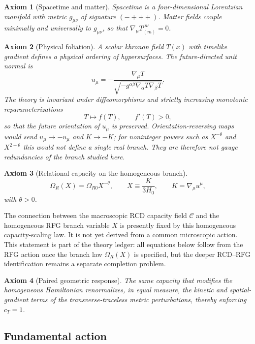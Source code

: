 \documentclass[11pt,a4paper]{article}
\newtheorem{axiom}{Axiom}[section]
\newcommand{\C}{\mathcal{C}}
\begin{document}
\begin{axiom}[Spacetime and matter]
Spacetime is a four-dimensional Lorentzian manifold with metric \(g_{\mu\nu}\) of signature \((-+++)\). Matter fields couple minimally and universally to \(g_{\mu\nu}\), so that \(\nabla_\mu T^{\mu\nu}_{(m)}=0\).
\end{axiom}

\begin{axiom}[Physical foliation]
A scalar khronon field \(T(x)\) with timelike gradient defines a physical ordering of hypersurfaces. The future-directed unit normal is
\[
u_\mu=-\frac{\nabla_\mu T}{\sqrt{-g^{\alpha\beta}\nabla_\alpha T\nabla_\beta T}}.
\]
The theory is invariant under diffeomorphisms and strictly increasing monotonic reparameterizations
\[
T\mapsto f(T),\qquad f'(T)>0,
\]
so that the future orientation of \(u_\mu\) is preserved. Orientation-reversing maps would send \(u_\mu\to-u_\mu\) and \(K\to-K\); for noninteger powers such as \(X^{-\theta}\) and \(X^{2-\theta}\) this would not define a single real branch. They are therefore not gauge redundancies of the branch studied here.
\end{axiom}

\begin{axiom}[Relational capacity on the homogeneous branch]
\[
\Omega_R(X)=\Omega_{R0}X^{-\theta},\qquad X\equiv\frac{K}{3H_0},\qquad K=\nabla_\mu u^\mu,
\]
with \(\theta>0\).
\end{axiom}

The connection between the macroscopic RCD capacity field \(\C\) and the homogeneous RFG branch variable \(X\) is presently fixed by this homogeneous capacity-scaling law. It is not yet derived from a common microscopic action. This statement is part of the theory ledger: all equations below follow from the RFG action once the branch law \(\Omega_R(X)\) is specified, but the deeper RCD--RFG identification remains a separate completion problem.

\begin{axiom}[Paired geometric response]
The same capacity that modifies the homogeneous Hamiltonian renormalizes, in equal measure, the kinetic and spatial-gradient terms of the transverse-traceless metric perturbations, thereby enforcing \(c_T=1\).
\end{axiom}

\subsection{Fundamental action}
\end{document}
